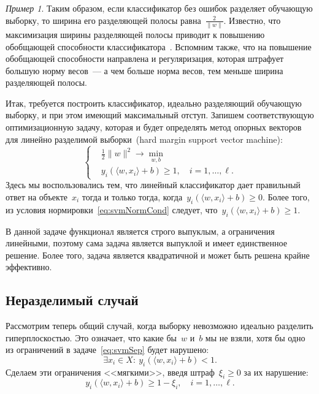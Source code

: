 \documentclass[a4paper, 12pt]{article}
\renewcommand{\geq}{\geqslant}
\theoremstyle{plain} %
\theoremstyle{definition} %
\theoremstyle{remark} %
\newtheorem{example}{Пример}
\begin{document}
\begin{example}
Таким образом, если классификатор без ошибок разделяет обучающую выборку,
то ширина его разделяющей полосы равна~$\frac{2}{\|w\|}$.
Известно, что максимизация ширины разделяющей полосы приводит
к повышению обобщающей способности классификатора~\cite{mohri12foundations}.
Вспомним также, что на повышение обобщающей способности направлена и регуляризация,
которая штрафует большую норму весов~--- а чем больше норма весов,
тем меньше ширина разделяющей полосы.

Итак, требуется построить классификатор, идеально разделяющий обучающую выборку,
и при этом имеющий максимальный отступ.
Запишем соответствующую оптимизационную задачу,
которая и будет определять метод опорных векторов для линейно разделимой выборки~(hard margin support vector machine):
\begin{equation}
\label{eq:svmSep}
    \left\{
        \begin{aligned}
            & \frac{1}{2} \|w\|^2 \to \min_{w, b} \\
            & y_i \left(
                \langle w, x_i \rangle + b
            \right) \geq 1, \quad i = 1, \dots, \ell.
        \end{aligned}
    \right.
\end{equation}
Здесь мы воспользовались тем, что линейный классификатор дает правильный ответ
на объекте~$x_i$ тогда и только тогда, когда~$y_i (\langle w, x_i \rangle + b) \geq 0$.
Более того, из условия нормировки~\eqref{eq:svmNormCond} следует,
что~$y_i (\langle w, x_i \rangle + b) \geq 1$.

В данной задаче функционал является строго выпуклым, а ограничения линейными,
поэтому сама задача является выпуклой и имеет единственное решение.
Более того, задача является квадратичной и может быть решена крайне эффективно.

\subsection{Неразделимый случай}
Рассмотрим теперь общий случай, когда выборку
невозможно идеально разделить гиперплоскостью.
Это означает, что какие бы~$w$ и~$b$ мы не взяли,
хотя бы одно из ограничений в задаче~\eqref{eq:svmSep}
будет нарушено:
\[
    \exists x_i \in X:\
    y_i \left(
        \langle w, x_i \rangle + b
    \right) < 1.
\]
Сделаем эти ограничения <<мягкими>>, введя штраф~$\xi_i \geq 0$ за их нарушение:
\[
    y_i \left(
        \langle w, x_i \rangle + b
    \right) \geq 1 - \xi_i, \quad i = 1, \dots, \ell.
\]


\end{example}
\end{document}
